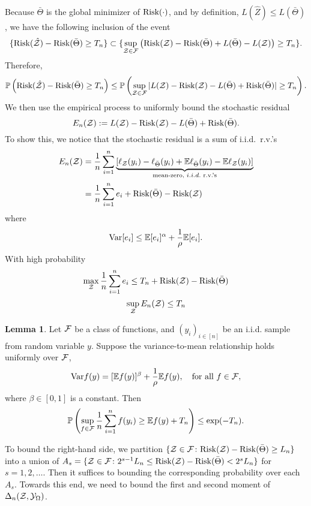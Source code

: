 \documentclass[11pt]{article}
\theoremstyle{definition}
\newtheorem{lem}[thm]{Lemma}
\def\risk{\textup{Risk}}
\newcommand*{\KeepStyleUnderBrace}[1]{%
  \mathop{%
    \mathchoice
    {\underbrace{\displaystyle#1}}%
    {\underbrace{\textstyle#1}}%
    {\underbrace{\scriptstyle#1}}%
    {\underbrace{\scriptscriptstyle#1}}%
  }\limits
}
\begin{document}
Because $\bar \Theta$ is the global minimizer of $\risk(\cdot)$, and by definition, $L(\hat Z)\leq L(\bar \Theta)$, we have the following inclusion of the event 
\[
\{\risk(\hat \tZ)-\risk(\bar \Theta) \geq T_n \}\subset \{ \sup_{\tZ\in \tF}\left(\risk(\tZ)-\risk(\bar \Theta)+L(\bar \Theta)-L(\tZ)\right)\geq {T_n} \}.
\]
Therefore,
\[
\mathbb{P}\left( \risk(\hat \tZ)-\risk(\bar \Theta) \geq T_n \right)\leq \mathbb{P}\left(\sup_{\tZ\in \tF}|L(\tZ)-\risk(\tZ)-L(\bar \Theta)+\risk(\bar \Theta)| \geq {T_n} \right).
\]
We then use the empirical process to uniformly bound the stochastic residual
\[
E_n(\tZ):=L(\tZ)-\risk(\tZ)-L(\bar \Theta)+\risk(\bar \Theta).
\]
To show this, we notice that the stochastic residual is a sum of i.i.d.\ r.v.'s
\begin{align}
E_n(\tZ)&={1\over n}\sum_{i=1}^n \KeepStyleUnderBrace{\left[ \ell_{\tZ}(y_i)-\ell_{\bar \Theta}(y_i)+\mathbb{E}\ell_{\bar \Theta}(y_i)-\mathbb{E}\ell_{\tZ}(y_i)\right]}_{\text{mean-zero, $i.i.d.$ r.v.'s}}\\
&={1\over n}\sum_{i=1}^n  e_i+\risk(\bar \Theta)-\risk(\tZ)
\end{align}
where
\[
\text{Var}[e_i]\leq \mathbb{E}[e_i]^{\alpha}+{1\over \rho}\mathbb{E}[e_i].
\]
With high probability 
\[
\max_{\tZ}{1\over n}\sum_{i=1}^n e_i \leq T_n +\risk(\tZ)-\risk(\bar \Theta)
\]
\[
 \sup_{\mathcal{Z}}E_n(\mathcal{Z}) \leq T_n 
\]

\begin{lem} Let $\mathcal{F}$ be a class of functions, and $(y_i)_{i\in[n]}$ be an i.i.d. sample from random variable $y$. Suppose the variance-to-mean relationship holds uniformly over $\mathcal{F}$,
\[
\text{Var}f(y)=[\mathbb{E}f(y)]^\beta+{1\over \rho}\mathbb{E}f(y), \quad \text{for all }f\in\mathcal{F},
\]
where $\beta\in[0,1]$ is a constant. Then
\[
\mathbb{P}\left(\sup_{f\in \mathcal{F}} {1\over n}\sum_{i=1}^nf(y_i)\geq  \mathbb{E}f(y)+T_n    \right)\leq \exp(-T_n).
\]
\end{lem}

To bound the right-hand side, we partition $\{\tZ\in\tF\colon \risk(\tZ)-\risk(\bar \Theta) \geq L_n\}$ into a union of $A_s=\{\tZ\in\tF\colon 2^{s-1}L_n \leq  \risk(\tZ)-\risk(\bar \Theta)  <2^sL_n\}$ for $s=1,2,\ldots$. Then it suffices to bounding the corresponding probability over each $A_s$. Towards this end, we need to bound the first and second moment of $\Delta_n(\mathcal{Z}, \mathcal{Y}_{\Omega})$.
\end{document}

